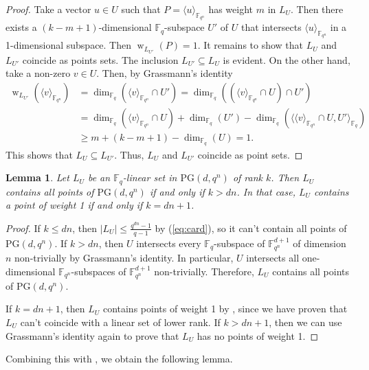 \documentclass[11pt]{article}
\newtheorem{lemma}[theorem]{Lemma}
\theoremstyle{definition}
\newcommand{\fqn}{\mathbb{F}_{q^n}}
\newcommand{\F}{{\mathbb F}}
\newcommand{\fq}{{\mathbb F}_{q}}
\newcommand{\PG}{\mathrm{PG}}
\newcommand{\pg}{\PG}
\DeclareMathOperator{\ww}{w}
\begin{document}
\begin{proof}
 Take a vector $u \in U$ such that $P = \langle u \rangle_{\fqn}$ has weight $m$ in $L_U$.
 Then there exists a $(k-m+1)$-dimensional $\fq$-subspace $U'$ of $U$ that intersects $\langle u \rangle_{\F_{q^n}}$ in a 1-dimensional subspace.
 Then $\ww_{L_{U'}}(P) = 1$.
 It remains to show that $L_U$ and $L_{U'}$ coincide as points sets.
 The inclusion $L_{U'} \subseteq L_U$ is evident.
 On the other hand, take a non-zero $v \in U$.
 Then, by Grassmann's identity
 \begin{align*}
  \ww_{L_{U'}}(\langle v \rangle_{\fqn})
  &= \dim_{\fq} ( \langle v \rangle_{\fqn} \cap U')
  = \dim_{\fq} ((\langle v \rangle_{\fqn} \cap U) \cap U') \\
  & = \dim_{\fq} (\langle v \rangle_{\fqn} \cap U) + \dim_{\fq} (U') - \dim_{\F_q} (\langle \langle v \rangle_{\F_{q^n}} \cap U, U' \rangle_{\F_q}) \\
  & \geq m + (k-m+1) - \dim_{\fq} (U) = 1.
 \end{align*}
This shows that $L_U \subseteq L_{U'}$.
Thus, $L_U$ and $L_{U'}$ coincide as point sets.
\end{proof}

\begin{lemma} \label{Lm:AllPoints}
 Let $L_U$ be an $\fq$-linear set in $\pg(d,q^n)$ of rank $k$.
 Then $L_U$ contains all points of $\pg(d,q^n)$ if and only if $k > dn$.
 In that case, $L_U$ contains a point of weight 1 if and only if $k = dn+1$.
\end{lemma}

\begin{proof}
 If $k \leq dn$, then $|L_U| \leq \frac{q^{dn}-1}{q-1}$ by (\ref{eq:card}), so it can't contain all points of $\pg(d,q^n)$.
 If $k > dn$, then $U$ intersects every $\fq$-subspace of $\fqn^{d+1}$ of dimension $n$ non-trivially by Grassmann's identity.
 In particular, $U$ intersects all one-dimensional $\fqn$-subspaces of $\fqn^{d+1}$ non-trivially.
 Therefore, $L_U$ contains all points of $\pg(d,q^n)$.
 
 If $k = dn+1$, then $L_U$ contains points of weight 1 by , since we have proven that $L_U$ can't coincide with a linear set of lower rank.
 If $k > dn+1$, then we can use Grassmann's identity again to prove that $L_U$ has no points of weight 1.
\end{proof}

Combining this with , we obtain the following lemma.
\end{document}
